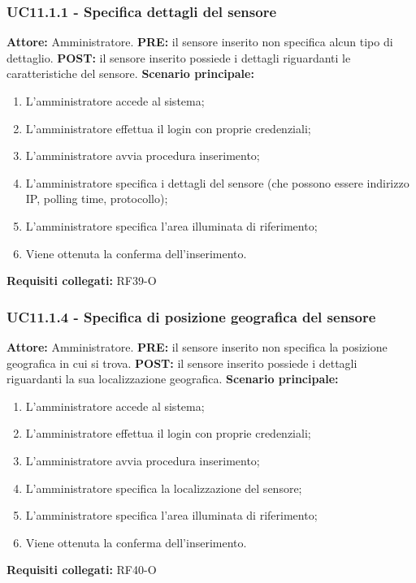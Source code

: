 \documentclass[a4paper, 12pt]{article}
\begin{document}
\subsubsection{UC11.1.1 - Specifica dettagli del sensore}
\textbf{Attore:} Amministratore.\newline
\textbf{PRE:} il sensore inserito non specifica alcun tipo di dettaglio.\newline
\textbf{POST:} il sensore inserito possiede i dettagli riguardanti le caratteristiche del sensore.\newline
\textbf{Scenario principale:}
\begin{enumerate}
    \item L'amministratore accede al sistema;
    \item L'amministratore effettua il login con proprie credenziali;
    \item L'amministratore avvia procedura inserimento;
    \item L'amministratore specifica i dettagli del sensore (che possono essere indirizzo IP, polling time, protocollo);
    \item L'amministratore specifica l'area illuminata di riferimento;
    \item Viene ottenuta la conferma dell'inserimento.
\end{enumerate}
\textbf{Requisiti collegati:} RF39-O\newline

\subsubsection{UC11.1.4 - Specifica di posizione geografica del sensore}
\textbf{Attore:} Amministratore.\newline
\textbf{PRE:} il sensore inserito non specifica la posizione geografica in cui si trova.\newline
\textbf{POST:} il sensore inserito possiede i dettagli riguardanti la sua localizzazione geografica.\newline
\textbf{Scenario principale:}
\begin{enumerate}
    \item L'amministratore accede al sistema;
    \item L'amministratore effettua il login con proprie credenziali;
    \item L'amministratore avvia procedura inserimento;
    \item L'amministratore specifica la localizzazione del sensore;
    \item L'amministratore specifica l'area illuminata di riferimento;
    \item Viene ottenuta la conferma dell'inserimento.
\end{enumerate}
\textbf{Requisiti collegati:} RF40-O\newline
\end{document}
